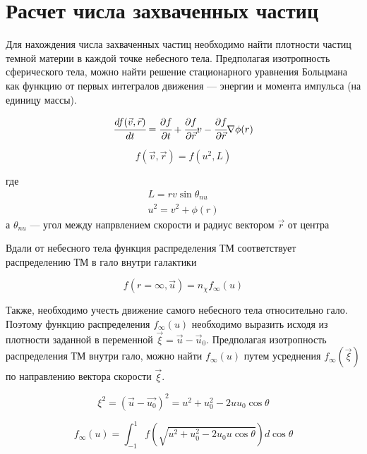 \section{Расчет числа захваченных частиц}

Для нахождения числа захваченных частиц необходимо найти плотности частиц
темной материи в каждой точке небесного тела. Предполагая изотропность 
сферического тела, можно найти решение стационарного уравнения Больцмана как функцию от 
первых интегралов движения --- энергии и момента импульса (на единицу массы).

\begin{equation}
	\label{boltsman_capt}
	\cfrac{d f(\vec{v},\vec{r})}{d t} = \cfrac{\partial f}{\partial t}+
	\cfrac{\partial f}{\partial \vec{r}}v - \cfrac{\partial f}{\partial \vec{r}}\nabla\phi(r)
\end{equation}


\begin{equation}
	f(\vec{v},\vec{r}) = f(u^2,L)
\end{equation}

где 
\begin{eqnarray}
	L = rv \sin {\theta_{nu}}\\
	u^2 = v^2 + \phi(r)
\end{eqnarray}
а $\theta_{nu}$ --- угол между напрвлением скорости и радиус вектором $\vec{r}$ от центра 

Вдали от небесного тела функция распределения ТМ соответствует распределению ТМ
в гало внутри галактики 

\begin{equation}
	f(r=\infty,\vec{u}) = n_{\chi}f_{\infty}(u)
\end{equation}



Также, необходимо учесть движение самого небесного тела относительно гало. Поэтому функцию распределения $f_{\infty}(u)$ необходимо выразить исходя из плотности 
заданной в переменной $\vec{\xi} = \vec{u} - \vec{u}_0$. 
Предполагая изотропность распределения ТМ внутри гало, можно найти $f_{\infty}(u)$
путем усреднения $f_{\infty}(\vec{\xi})$ по направлению вектора скорости $\vec{\xi}$.

\begin{equation}
	\xi^2 = (\vec{u} - \vec{u_0})^2 = u^2 + u_0^2 - 2 u u_0 \cos{\theta}
\end{equation}

\begin{equation}
	f_{\infty}(u) =
	 \int_{-1}^{1} f\left(\sqrt{u^2+u_0^2-2u_0 u \cos{\theta}}\right)
	 d \cos{\theta}
\end{equation}

